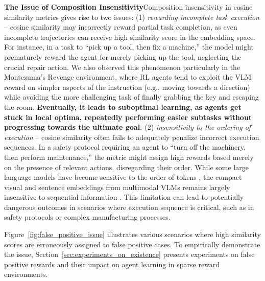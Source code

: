 \documentclass{article}
\theoremstyle{plain}
\theoremstyle{definition}
\theoremstyle{remark}
\begin{document}
\noindent \textbf{The Issue of Composition Insensitivity}\quad Composition insensitivity in cosine similarity metrics gives rise to two issues: (1) \emph{rewarding incomplete task execution} -- cosine similarity may incorrectly reward partial task completion, as even incomplete trajectories can receive high similarity score in the embedding space. For instance, in a task to ``pick up a tool, then fix a machine,'' the model might prematurely reward the agent for merely picking up the tool, neglecting the crucial repair action. We also observed this phenomenon particularly in the Montezuma's Revenge environment, where RL agents tend to exploit the VLM reward on simpler aspects of the instruction (e.g., moving towards a direction) while avoiding the more challenging task of finally grabbing the key and escaping the room. \textbf{Eventually, it leads to suboptimal learning, as agents get stuck in local optima, repeatedly performing easier subtasks without progressing towards the ultimate goal.} (2) \emph{insensitivity to the ordering of execution} -- cosine similarity often fails to adequately penalize incorrect execution sequences. In a safety protocol requiring an agent to ``turn off the machinery, then perform maintenance,'' the metric might assign high rewards based merely on the presence of relevant actions, disregarding their order. While some large language models have become sensitive to the order of tokens \citep{su2024roformer}, the compact visual and sentence embeddings from multimodal VLMs remains largely insensitive to sequential information \citep{pham2020out}. This limitation can lead to potentially dangerous outcomes in scenarios where execution sequence is critical, such as in safety protocols or complex manufacturing processes.

Figure~\ref{fig:false_positive_issue} illustrates various scenarios where high similarity scores are erroneously assigned to false positive cases. To empirically demonstrate the issue, Section~\ref{sec:experiments_on_existence} presents experiments on false positive rewards and their impact on agent learning in sparse reward environments.

\end{document}
